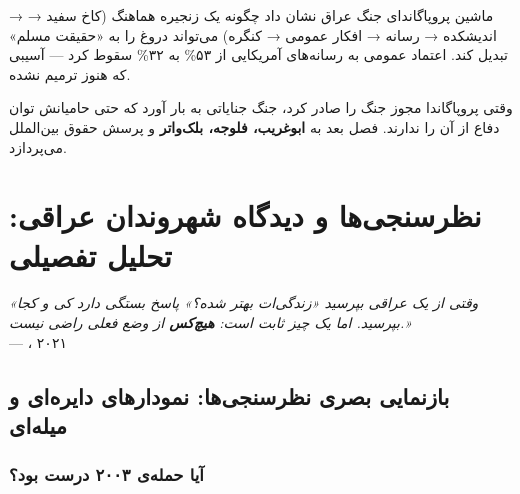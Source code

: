 
\begin{chaptersummary}
  ماشین پروپاگاندای جنگ عراق نشان داد چگونه
  یک زنجیره هماهنگ (کاخ سفید →  →
  اندیشکده → رسانه → افکار عمومی → کنگره)
  می‌تواند دروغ را به «حقیقت مسلم» تبدیل کند.
  اعتماد عمومی به رسانه‌های آمریکایی از ۵۳\%
  به ۳۲\% سقوط کرد — آسیبی که هنوز ترمیم نشده.
\end{chaptersummary}
\begin{chapterbridge}
  وقتی پروپاگاندا مجوز جنگ را صادر کرد،
  جنگ جنایاتی به بار آورد که حتی حامیانش
  توان دفاع از آن را ندارند.
  فصل بعد به \textbf{ابوغریب، فلوجه، بلک‌واتر}
  و پرسش حقوق بین‌الملل می‌پردازد.
\end{chapterbridge}

\chapter{نظرسنجی‌ها و دیدگاه شهروندان عراقی: تحلیل تفصیلی}

\begin{epigraphbox}
\textit{«وقتی از یک عراقی بپرسید
\textup{«}زندگی‌ات بهتر شده؟\textup{»}
پاسخ بستگی دارد کی و کجا بپرسید.
اما یک چیز ثابت است:
\textbf{هیچ‌کس} از وضع فعلی راضی نیست.»}\\[4pt]
\hfill --- ، ۲۰۲۱
\end{epigraphbox}


\section{بازنمایی بصری نظرسنجی‌ها: نمودارهای دایره‌ای و میله‌ای}

\subsection{آیا حمله‌ی ۲۰۰۳ درست بود؟}


